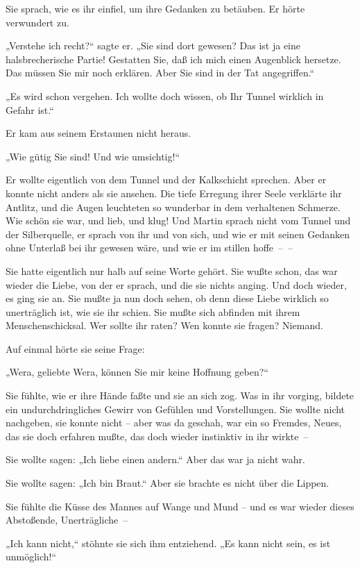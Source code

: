 Sie sprach, wie es ihr einfiel, um ihre Gedanken zu betäuben. Er
hörte verwundert zu.

„Verstehe ich recht?“ sagte er. „Sie sind dort gewesen? Das ist ja
eine halsbrecherische Partie! Gestatten Sie, daß ich mich einen
Augenblick hersetze. Das müssen Sie mir noch erklären. Aber Sie
sind in der Tat angegriffen.“

„Es wird schon vergehen. Ich wollte doch wissen, ob Ihr Tunnel
wirklich in Gefahr ist.“

Er kam aus seinem Erstaunen nicht heraus.

„Wie gütig Sie sind! Und wie umsichtig!“

Er wollte eigentlich von dem Tunnel und der Kalkschicht sprechen.
Aber er konnte nicht anders als sie ansehen. Die tiefe Erregung
ihrer Seele verklärte ihr Antlitz, und die Augen leuchteten so
wunderbar in dem verhaltenen Schmerze. Wie schön sie war, und lieb,
und klug! Und Martin sprach nicht vom Tunnel und der Silberquelle,
er sprach von ihr und von sich, und wie er mit seinen Gedanken ohne
Unterlaß bei ihr gewesen wäre, und wie er im stillen hoffe~–~–

Sie hatte eigentlich nur halb auf seine Worte gehört. Sie wußte
schon, das war wieder die Liebe, von der er sprach, und die sie
nichts anging. Und doch wieder, es ging sie an. Sie mußte ja nun
doch sehen, ob denn diese Liebe wirklich so unerträglich ist, wie
sie ihr schien. Sie mußte sich abfinden mit ihrem
Menschenschicksal. Wer sollte ihr raten? Wen konnte sie fragen?
Niemand.

Auf einmal hörte sie seine Frage:

„Wera, geliebte Wera, können Sie mir keine Hoffnung geben?“

Sie fühlte, wie er ihre Hände faßte und sie an sich zog. Was in ihr
vorging, bildete ein undurchdringliches Gewirr von Gefühlen und
Vorstellungen. Sie wollte nicht nachgeben, sie konnte nicht – aber
was da geschah, war ein so Fremdes, Neues, das sie doch erfahren
mußte, das doch wieder instinktiv in ihr wirkte~–

Sie wollte sagen: „Ich liebe einen andern.“ Aber das war ja nicht
wahr.

Sie wollte sagen: „Ich bin Braut.“ Aber sie brachte es nicht über
die Lippen.

Sie fühlte die Küsse des Mannes auf Wange und Mund – und es war
wieder dieses Abstoßende, Unerträgliche~–

„Ich kann nicht,“ stöhnte sie sich ihm entziehend. „Es kann nicht
sein, es ist unmöglich!“

